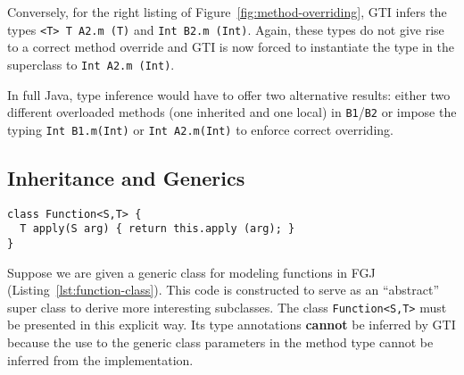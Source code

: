 Conversely, for the right listing of
Figure~\ref{fig:method-overriding}, GTI infers the types
\texttt{<T> T A2.m (T)} and \texttt{Int B2.m (Int)}. Again, these
types do not give rise to a correct method override and 
GTI is now forced to instantiate the type in the superclass to
\texttt{Int A2.m (Int)}.




In full Java, type inference would have to offer two alternative
results: either two different
overloaded methods (one inherited and one local) in \texttt{B1}/\texttt{B2} or
impose the typing \texttt{Int B1.m(Int)} or \texttt{Int A2.m(Int)} to enforce correct overriding. 


\subsection{Inheritance and Generics}
\label{sec:inheritance-generics}


\begin{lstlisting}[float,caption={Function class}, label={lst:function-class},style=fgj]
class Function<S,T> {
  T apply(S arg) { return this.apply (arg); }
}
\end{lstlisting}
Suppose we are given a generic class for modeling functions in  FGJ (Listing~\ref{lst:function-class}).
This code is constructed to serve as an ``abstract'' super class to derive more
interesting subclasses.
The class \texttt{Function<S,T>} must be presented in this explicit
way. Its type annotations \textbf{cannot} be inferred by GTI because
the use to the generic class parameters in the method type cannot be inferred from the
implementation.

